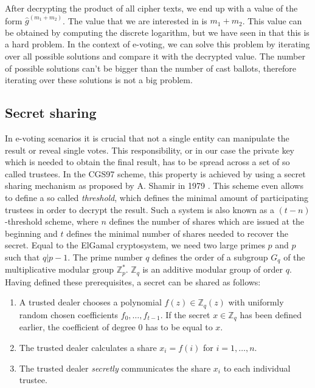 \documentclass[numbers=noenddot, abstract=on, a4paper, headsepline,
footsepline, oneside, openright, draft=off, listof=leveldown]{scrreprt}
\begin{document}
After decrypting the product of all cipher texts, we end up with a value of the
form $\hat{g}^{(m_1+m_2)}$. The value that we are interested in is $m_1+m_2$.
This value can be obtained by computing the discrete logarithm, but we have seen in
 that this is a hard problem. In the context of
e-voting, we can solve this problem by iterating over all possible solutions and
compare it with the decrypted value. The number of possible solutions can't be
bigger than the number of cast ballots, therefore iterating over these solutions
is not a big problem.


\subsection{Secret sharing}
\label{sec:secretsharing}
In e-voting scenarios it is crucial that not a
single entity can manipulate the result or reveal single votes. This
responsibility, or in our case the private key which is needed to obtain the
final result, has to be spread across a set of so called trustees. In the CGS97
scheme, this property is achieved by using a secret sharing mechanism as
proposed by A. Shamir in 1979 \cite{Shamir79}. This scheme even allows to define a so called
\textit{threshold}, which defines the minimal amount of participating trustees
in order to decrypt the result. Such a system is also known as a
$(t-n)$-threshold scheme, where $n$ defines the number of shares which are
issued at the beginning and $t$ defines the minimal number of shares
needed to recover the secret. Equal to the ElGamal cryptosystem, we need two large primes
$p$ and $p$ such that $q|p-1$. The prime number $q$ defines the order of a
subgroup $G_q$ of the multiplicative modular group $\mathbb{Z}^*_p$.
$\mathbb{Z}_q$ is an additive modular group of order $q$. Having defined these
prerequisites, a secret can be shared as follows:
\begin{enumerate}
  \item A trusted dealer chooses a polynomial $f(z) \in \mathbb{Z}_q(z)$ with
  uniformly random chosen coefficients $f_0, \ldots, f_{t-1}$.
  If the secret $x \in \mathbb{Z}_q$ has been defined earlier, the coefficient of degree $0$ has to
  be equal to $x$.
  \item The trusted dealer calculates a share $x_i = f(i)$ for $i = 1,\ldots,
  n$.
  \item The trusted dealer \emph{secretly} communicates the share $x_i$ to each
  individual trustee.
\end{enumerate}
\end{document}
